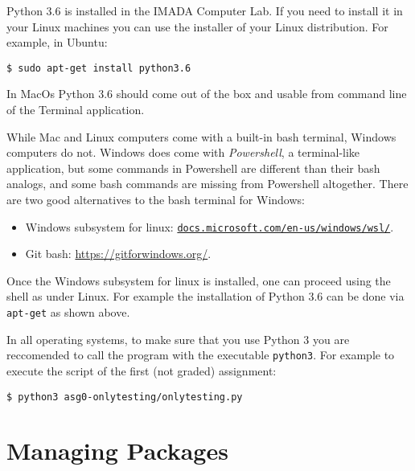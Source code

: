 Python 3.6 is installed in the IMADA Computer Lab. If you need to
install it in your Linux machines you can use the installer of your Linux
distribution. For example, in Ubuntu:

\begin{lstlisting}
$ sudo apt-get install python3.6
\end{lstlisting}

In MacOs Python 3.6 should come out of the box and usable from command
line of the Terminal application.



\begin{info}
While Mac and Linux computers come with a built-in bash terminal, Windows computers do not.
Windows does come with \emph{Powershell}, a terminal-like application, but some commands in Powershell are different than their bash analogs, and some bash commands are missing from Powershell altogether.
There are two good alternatives to the bash terminal for Windows:
\begin{itemize}
\item Windows subsystem for linux: \href{https://docs.microsoft.com/en-us/windows/wsl/install-win10}{\texttt{docs.microsoft.com/en-us/windows/wsl/}}.
\item Git bash: \url{https://gitforwindows.org/}.
\end{itemize}
\end{info}

Once the Windows subsystem for linux is installed, one can proceed using
the shell as under Linux. For example the installation of Python 3.6 can
be done via \lstinline{apt-get} as shown above.

In all operating systems, to make sure that you use Python 3 you are
reccomended to call the program with the
executable \lstinline{python3}. For example to execute the script of the
first (not graded) assignment:

\begin{lstlisting}
$ python3 asg0-onlytesting/onlytesting.py
\end{lstlisting}


\section*{Managing Packages} %


